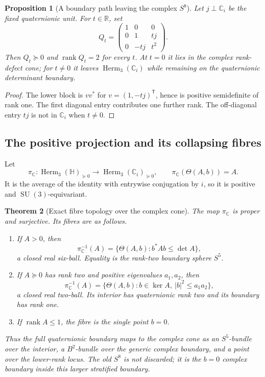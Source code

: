 \documentclass[11pt]{article}
\newtheorem{theorem}{Theorem}[section]
\newtheorem{proposition}[theorem]{Proposition}
\theoremstyle{definition}
\theoremstyle{remark}
\newcommand{\R}{\mathbb R}
\newcommand{\C}{\mathbb C}
\newcommand{\Hh}{\mathbb H}
\newcommand{\Herm}{\operatorname{Herm}}
\newcommand{\rank}{\operatorname{rank}}
\newcommand{\SU}{\operatorname{SU}}
\begin{document}
\begin{proposition}[A boundary path leaving the complex $S^8$]\label{prop:boundary-escape}
Let $j\perp\C_i$ be the fixed quaternionic unit.  For $t\in\R$, set
\begin{equation}\label{eq:escape-path}
 Q_t=
 \begin{pmatrix}
 1&0&0\\
 0&1&t j\\
 0&-t j&t^2
 \end{pmatrix}.
\end{equation}
Then $Q_t\succeq0$ and $\rank Q_t=2$ for every $t$.  At $t=0$ it lies in the complex rank-defect cone; for $t\neq0$ it leaves $\Herm_3(\C_i)$ while remaining on the quaternionic determinant boundary.
\end{proposition}

\begin{proof}
The lower block is $vv^*$ for $v=(1,-tj)^{\mathsf T}$, hence is positive semidefinite of rank one.  The first diagonal entry contributes one further rank.  The off-diagonal entry $tj$ is not in $\C_i$ when $t\neq0$.
\end{proof}

\subsection{The positive projection and its collapsing fibres}

Let
\[
 \pi_{\C}:\Herm_3(\Hh)_{\succeq0}\longrightarrow
 \Herm_3(\C_i)_{\succeq0},
 \qquad \pi_{\C}(\Theta(A,b))=A.
\]
It is the average of the identity with entrywise conjugation by $i$, so it is positive and $\SU(3)$-equivariant.

\begin{theorem}[Exact fibre topology over the complex cone]\label{thm:positive-fibres}
The map $\pi_{\C}$ is proper and surjective.  Its fibres are as follows.
\begin{enumerate}
\item If $A>0$, then
\begin{equation}\label{eq:B6-fibre}
 \pi_{\C}^{-1}(A)
 =\{\Theta(A,b):b^*Ab\leq\det A\},
\end{equation}
a closed real six-ball.  Equality is the rank-two boundary sphere $S^5$.
\item If $A\succeq0$ has rank two and positive eigenvalues $a_1,a_2$, then
\begin{equation}\label{eq:B2-fibre}
 \pi_{\C}^{-1}(A)
 =\{\Theta(A,b):b\in\ker A,\ |b|^2\leq a_1a_2\},
\end{equation}
a closed real two-ball.  Its interior has quaternionic rank two and its boundary has rank one.
\item If $\rank A\leq1$, the fibre is the single point $b=0$.
\end{enumerate}
Thus the full quaternionic boundary maps to the complex cone as an $S^5$-bundle over the interior, a $B^2$-bundle over the generic complex boundary, and a point over the lower-rank locus.  The old $S^8$ is not discarded; it is the $b=0$ complex boundary inside this larger stratified boundary.
\end{theorem}
\end{document}
